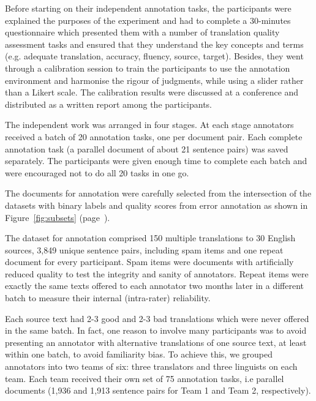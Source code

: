 
Before starting on their independent annotation tasks, the participants were explained the purposes of the experiment and had to complete a 30-minutes questionnaire which presented them with a number of translation quality assessment tasks and ensured that they understand the key concepts and terms (e.g. adequate translation, accuracy, fluency, source, target).
Besides, they went through a calibration session to train the participants to use the annotation environment and harmonise the rigour of judgments, while using a slider rather than a Likert scale. 
The calibration results were discussed at a conference and distributed as a written report among the participants.

The independent work was arranged in four stages. At each stage annotators received a batch of 20 annotation tasks, one per document pair. Each complete annotation task (a parallel document of about 21 sentence pairs) was saved separately. The participants were given enough time to complete each batch and were encouraged not to do all 20 tasks in one go.

\label{pg:intersection140}
The documents for annotation were carefully selected from the intersection of the datasets with binary labels and quality scores from error annotation as shown in Figure~\ref{fig:subsets} (page~\pageref{pg:subsets}).

The dataset for annotation comprised 150 multiple translations to 30 English sources, 3,849 unique sentence pairs, including spam items and one repeat document for every participant. 
Spam items were documents with artificially reduced quality to test the integrity and sanity of annotators. Repeat items were exactly the same texts offered to each annotator two months later in a different batch to measure their internal (intra-rater) reliability.

Each source text had 2-3 good and 2-3 bad translations which were never offered in the same batch. In fact, one reason to involve many participants was to avoid presenting an annotator with alternative translations of one source text, at least within one batch, to avoid familiarity bias. To achieve this, we grouped annotators into two teams of six: three translators and three linguists on each team. Each team received their own set of 75 annotation tasks, i.e parallel documents (1,936 and 1,913 sentence pairs for Team 1 and Team 2, respectively). 

